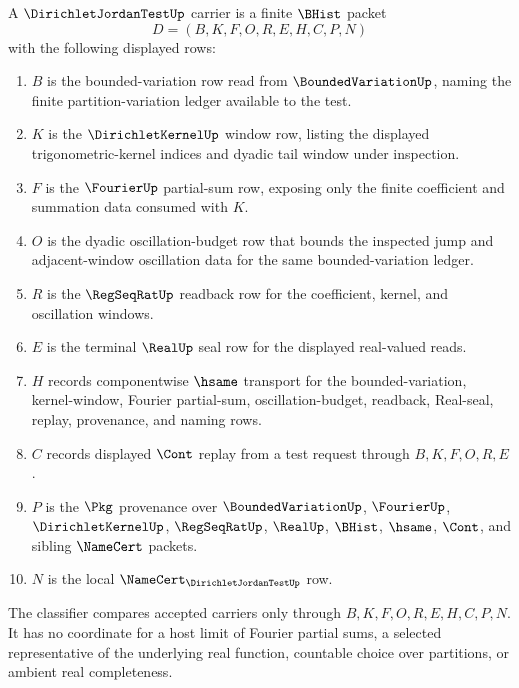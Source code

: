 \begin{definition}
\label{def:dirichlet-jordan-test-carrier}
A $\DirichletJordanTestUp$ carrier is a finite $\BHist$ packet
$$
D=(B,K,F,O,R,E,H,C,P,N)
$$
with the following displayed rows:
\begin{enumerate}
\item $B$ is the bounded-variation row read from $\BoundedVariationUp$, naming the finite partition-variation ledger available to the test.
\item $K$ is the $\DirichletKernelUp$ window row, listing the displayed trigonometric-kernel indices and dyadic tail window under inspection.
\item $F$ is the $\FourierUp$ partial-sum row, exposing only the finite coefficient and summation data consumed with $K$.
\item $O$ is the dyadic oscillation-budget row that bounds the inspected jump and adjacent-window oscillation data for the same bounded-variation ledger.
\item $R$ is the $\RegSeqRatUp$ readback row for the coefficient, kernel, and oscillation windows.
\item $E$ is the terminal $\RealUp$ seal row for the displayed real-valued reads.
\item $H$ records componentwise $\hsame$ transport for the bounded-variation, kernel-window, Fourier partial-sum, oscillation-budget, readback, Real-seal, replay, provenance, and naming rows.
\item $C$ records displayed $\Cont$ replay from a test request through $B,K,F,O,R,E$.
\item $P$ is the $\Pkg$ provenance over $\BoundedVariationUp$, $\FourierUp$, $\DirichletKernelUp$, $\RegSeqRatUp$, $\RealUp$, $\BHist$, $\hsame$, $\Cont$, and sibling $\NameCert$ packets.
\item $N$ is the local $\NameCert_{\DirichletJordanTestUp}$ row.
\end{enumerate}
The classifier compares accepted carriers only through $B,K,F,O,R,E,H,C,P,N$. It has no coordinate for a host limit of Fourier partial sums, a selected representative of the underlying real function, countable choice over partitions, or ambient real completeness.
\end{definition}

